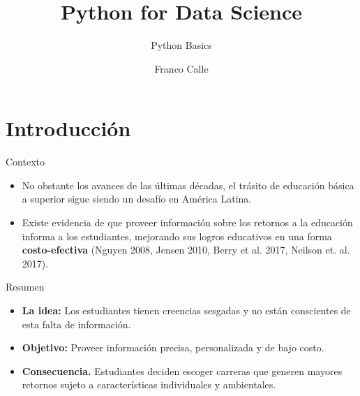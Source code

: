 \documentclass[english,spanish,aspectratio=169,11 pt,utf8]{beamer}	%
\newcommand\makebeamertitle{\frame{\maketitle}}%
\numberwithin{table}{section}
\numberwithin{figure}{section}
\theoremstyle{definition}
\theoremstyle{plain}
\theoremstyle{plain}
\theoremstyle{plain}
\begin{document}
\title{Python for Data Science}
\subtitle{Python Basics}
\author{Franco Calle}
\date{}
\thispagestyle{empty}	%
\makebeamertitle		%


\section{Introducción}

\begin{frame}{Contexto} %
	\begin{itemize}
		\setlength\itemsep{1em}
		\item No obstante los avances de las últimas décadas, el trásito de educación básica a superior sigue siendo un desafío en América Latina.
		\item Existe evidencia de que proveer información sobre los retornos a la educación informa a los estudiantes, mejorando sus logros educativos en una forma  \textbf{costo-efectiva} (Nguyen 2008, Jensen 2010, Berry et al. 2017, Neilson et. al. 2017). 
	\end{itemize}
\end{frame} %

\begin{frame}{Resumen} %
	\begin{itemize}
		\setlength\itemsep{1em}
		\item \textbf{La idea:} Los estudiantes tienen creencias sesgadas y no están conscientes de esta falta de información.
		\item \textbf{Objetivo:} Proveer información precisa, personalizada y de bajo costo.
		\item  \textbf{Consecuencia.} Estudiantes deciden escoger carreras que generen mayores retornos sujeto a características individuales y ambientales.
	\end{itemize}
\end{frame} %
\end{document}
